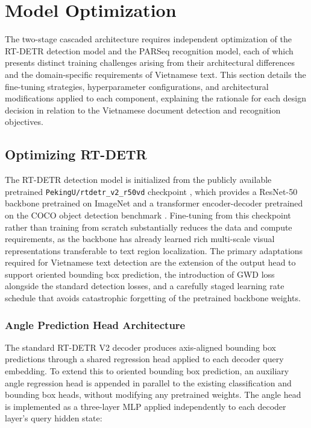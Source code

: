 \section{Model Optimization}
\label{sec:optimization}
The two-stage cascaded architecture requires independent optimization of the RT-DETR detection model and the PARSeq recognition model, each of which presents distinct training challenges arising from their architectural differences and the domain-specific requirements of Vietnamese text. This section details the fine-tuning strategies, hyperparameter configurations, and architectural modifications applied to each component, explaining the rationale for each design decision in relation to the Vietnamese document detection and recognition objectives.

\subsection{Optimizing RT-DETR}
The RT-DETR detection model is initialized from the publicly available pretrained \texttt{PekingU/rtdetr\_v2\_r50vd} checkpoint \cite{Zhao2024}, which provides a ResNet-50 backbone pretrained on ImageNet \cite{He2015} and a transformer encoder-decoder pretrained on the COCO object detection benchmark \cite{Lin2015}. Fine-tuning from this checkpoint rather than training from scratch substantially reduces the data and compute requirements, as the backbone has already learned rich multi-scale visual representations transferable to text region localization. The primary adaptations required for Vietnamese text detection are the extension of the output head to support oriented bounding box prediction, the introduction of GWD loss alongside the standard detection losses, and a carefully staged learning rate schedule that avoids catastrophic forgetting of the pretrained backbone weights.

\subsubsection{Angle Prediction Head Architecture}
The standard RT-DETR V2 decoder produces axis-aligned bounding box predictions through a shared regression head applied to each decoder query embedding. To extend this to oriented bounding box prediction, an auxiliary angle regression head is appended in parallel to the existing classification and bounding box heads, without modifying any pretrained weights. The angle head is implemented as a three-layer MLP applied independently to each decoder layer's query hidden state:

